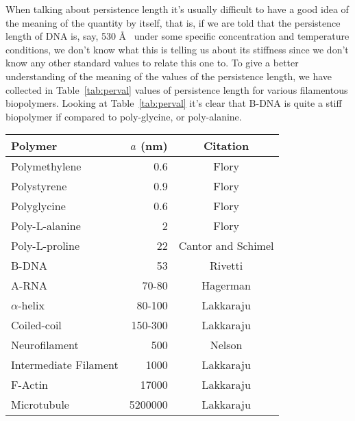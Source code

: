 When talking about persistence length it's usually difficult to have a
good idea of the meaning of the quantity by itself, that is, if we are
told that the  persistence length of DNA is, say,  530 \AA~ under some
specific concentration and temperature  conditions, we don't know what
this is telling us about its stiffness since we don't know any other
standard values to relate this one to. To give
a better understanding of the meaning of the values of the persistence
length,  we   have  collected  in   Table~\ref{tab:perval}  values  of
persistence  length for various  filamentous biopolymers.   Looking at
Table~\ref{tab:perval}  it's  clear  that   B-DNA  is  quite  a  stiff
biopolymer if compared to poly-glycine, or poly-alanine.

\begin{table}[htbp]
\begin{center}
\begin{threeparttable}
\begin{tabular}{l|r|c}
\hline
Polymer               & $a$ (nm) & Citation  \\ \hline
Polymethylene         & 0.6      & Flory\tnote{a}      \\  
Polystyrene           & 0.9      & Flory\tnote{a}      \\
Polyglycine           & 0.6      & Flory \tnote{b}     \\
Poly-L-alanine        & 2        & Flory \tnote{b}     \\
Poly-L-proline        & 22       & Cantor and Schimel \cite{cantor1980} \\
B-DNA                 & 53       & Rivetti \cite{rivetti1996}     \\
A-RNA                 & 70-80    & Hagerman  \cite{hagerman1997}  \\
$\alpha$-helix        & 80-100   & Lakkaraju \cite{lakkaraju2009} \\
Coiled-coil           & 150-300  & Lakkaraju \cite{lakkaraju2009} \\
Neurofilament         & 500      & Nelson    \cite{nelson2004}    \\
Intermediate Filament & 1000     & Lakkaraju \cite{lakkaraju2009} \\
F-Actin               & 17000    & Lakkaraju \cite{lakkaraju2009} \\
Microtubule           & 5200000  & Lakkaraju \cite{lakkaraju2009} \\
\hline
\end{tabular}
\begin{tablenotes}

\end{tablenotes}
\end{threeparttable}
\end{center}
\end{table}
